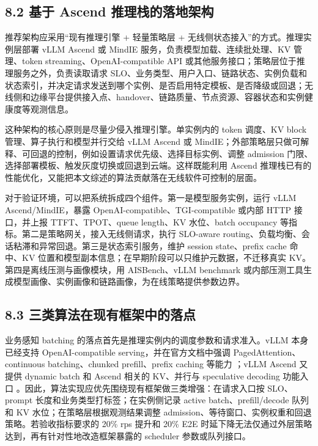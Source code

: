 \subsection*{8.2 基于 Ascend 推理栈的落地架构}

推荐架构应采用“现有推理引擎 + 轻量策略层 + 无线侧状态接入”的方式。推理实例层部署 vLLM Ascend 或 MindIE 服务，负责模型加载、连续批处理、KV 管理、token streaming、OpenAI-compatible API 或其他服务接口；策略层位于推理服务之外，负责读取请求 SLO、业务类型、用户入口、链路状态、实例负载和状态索引，并决定请求发送到哪个实例、是否启用特定模板、是否降级或回退；无线侧和边缘平台提供接入点、handover、链路质量、节点资源、容器状态和实例健康度等观测信息。

这种架构的核心原则是尽量少侵入推理引擎。单实例内的 token 调度、KV block 管理、算子执行和模型并行交给 vLLM Ascend 或 MindIE；外部策略层只做可解释、可回退的控制，例如设置请求优先级、选择目标实例、调整 admission 门限、选择部署模板、触发灰度切换或回退到云端。这样既能利用 Ascend 推理栈已有的性能优化，又能把本文综述的算法贡献落在无线软件可控制的层面。

对于验证环境，可以把系统拆成四个组件。第一是模型服务实例，运行 vLLM Ascend/MindIE，暴露 OpenAI-compatible、TGI-compatible 或内部 HTTP 接口，并上报 TTFT、TPOT、queue length、KV 水位、batch occupancy 等指标。第二是策略网关，接入无线侧请求，执行 SLO-aware routing、负载均衡、会话粘滞和异常回退。第三是状态索引服务，维护 session state、prefix cache 命中、KV 位置和模型副本信息；在早期阶段可以只维护元数据，不迁移真实 KV。第四是离线压测与画像模块，用 AISBench、vLLM benchmark 或内部压测工具生成模型画像、实例画像和链路画像，为在线策略提供参数边界。

\subsection*{8.3 三类算法在现有框架中的落点}

业务感知 batching 的落点首先是推理实例内的调度参数和请求准入。vLLM 本身已经支持 OpenAI-compatible serving，并在官方文档中强调 PagedAttention、continuous batching、chunked prefill、prefix caching 等能力 ；vLLM Ascend 又提供 dynamic batch 和 Ascend 相关的 KV、并行与 speculative decoding 功能入口 。因此，算法实现应优先围绕现有框架做三类增强：在请求入口按 SLO、prompt 长度和业务类型打标签；在实例侧记录 active batch、prefill/decode 队列和 KV 水位；在策略层根据观测结果调整 admission、等待窗口、实例权重和回退策略。若验收指标要求的 20\% rps 提升和 20\% E2E 时延下降无法仅通过外层策略达到，再有针对性地改造框架暴露的 scheduler 参数或队列接口。

